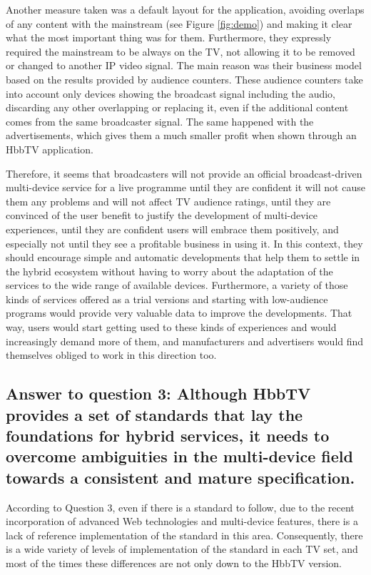 Another measure taken was a default layout for the application, avoiding overlaps of any content with the mainstream (see Figure \ref{fig:demo}) and making it clear what the most important thing was for them. Furthermore, they expressly required the mainstream to be always on the TV, not allowing it to be removed or changed to another IP video signal. The main reason was their business model based on the results provided by audience counters. These audience counters take into account only devices showing the broadcast signal including the audio, discarding any other overlapping or replacing it, even if the additional content comes from the same broadcaster signal. The same happened with the advertisements, which gives them a much smaller profit when shown through an HbbTV application. 

Therefore, it seems that broadcasters will not provide an official broadcast-driven multi-device service for a live programme until they are confident it will not cause them any problems and will not affect TV audience ratings, until they are convinced of the user benefit to justify the development of multi-device experiences, until they are confident users will embrace them positively, and especially not until they see a profitable business in using it. In this context, they should encourage simple and automatic developments that help them to settle in the hybrid ecosystem without having to worry about the adaptation of the services to the wide range of available devices. Furthermore, a variety of those kinds of services offered as a trial versions and starting with low-audience programs would provide very valuable data to improve the developments. That way, users would start getting used to these kinds of experiences and would increasingly demand more of them, and manufacturers and advertisers would find themselves obliged to work in this direction too. 

\subsection{Answer to question 3: Although HbbTV provides a set of standards that lay the foundations for hybrid services, it needs to overcome ambiguities in the multi-device field towards a consistent and mature specification.}
According to Question 3, even if there is a standard to follow, due to the recent incorporation of advanced Web technologies and multi-device features, there is a lack of reference implementation of the standard in this area. Consequently, there is a wide variety of levels of implementation of the standard in each TV set, and most of the times these differences are not only down to the HbbTV version. 

